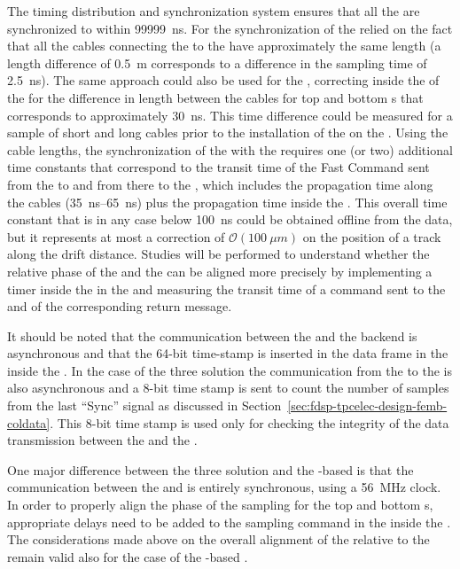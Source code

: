 The timing distribution and synchronization system ensures that
all the  are synchronized to within \SI{99999}{ns}. For
 the synchronization of the  relied on
the fact that all the cables connecting the  to the
 have approximately the same length (a length 
difference of \SI{0.5}{m} corresponds to a difference in the
sampling time of \SI{2.5}{ns}). The same approach could also
be used for the  , correcting inside
the  of the  for the difference in
length between the cables for top and bottom s
that corresponds to approximately \SI{30}{ns}. This time 
difference could be measured for a sample of short and long 
cables prior to the installation of the  on
the . Using the cable lengths, the synchronization 
of the  with the  requires one (or two)
additional time constants that correspond to the transit 
time of the Fast Command sent from the  to
 and from there to the ,
which includes the propagation time along the cables
(\SIrange{35}{65}{ns}) plus the propagation time inside
the . This overall time constant that is
in any case below \SI{100}{ns} could be obtained offline
from the data, but it represents at most a correction
of $\mathcal{O}(\SI{100}{\mu m})$ on the position of
a track along the drift distance. Studies will be performed
to understand whether the relative phase of the 
and the  can be aligned more precisely by
implementing a timer inside the  in the
 and measuring the transit time of a command
sent to the  and of the corresponding return
message.

It should be noted that the communication between the
 and the  backend is asynchronous
and that the \num{64}-bit time-stamp is inserted in the data frame
in the  inside the . In the case
of the three  solution the communication
from the  to the  is also
asynchronous and a \num{8}-bit time stamp is sent to
count the number of  samples from the last
``Sync'' signal as discussed in Section~\ref{sec:fdsp-tpcelec-design-femb-coldata}.
This \num{8}-bit time stamp is used only for checking
the integrity of the data transmission between the 
 and the . 

One major difference between the three 
solution and the -based  is
that the communication between the  and 
 is entirely synchronous, using a \SI{56}{MHz} 
clock. In order to properly align the phase of the
 sampling for the top and bottom s,
appropriate delays need to be added to the sampling
command in the  inside the .
The considerations made above on the overall alignment
of the  relative to the  remain
valid also for the case of the -based .

